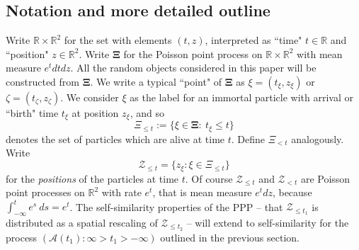 \documentclass[12pt]{article}
\renewcommand{\AA}{\mbox{${\mathcal A}$}}
\newcommand{\ZZ}{\mbox{${\mathcal Z}$}}
\newcommand{\Reals}{{\mathbb{R}}}
\begin{document}
\subsection{Notation and more detailed outline}
\label{sec:outline}
Write $\Reals \times \Reals^2$ for the set with elements $(t,z)$, 
interpreted as ``time" $t \in \Reals$ and ``position" $z \in \Reals^2$. 
Write $\bm{\Xi}$ for the Poisson point process on  $\Reals \times \Reals^2$ with mean measure 
$e^{t} dt dz$.
All the random objects considered in this paper will be constructed from $\bm{\Xi}$.
We write a typical ``point" of $\bm{\Xi}$ as $\xi = (t_\xi, z_\xi)$ or $\zeta = (t_\zeta, z_\zeta)$.
We consider $\xi$ as the label for an immortal particle with arrival or ``birth" time $t_\xi$ at position $z_\xi$, and so
\[ \Xi_{\le t} := \{\xi \in \bm{\Xi} : \ t_\xi \le t\} \]
denotes the set of particles which are alive at time $t$. 
Define $\Xi_{<t}$ analogously.
Write
\[ \ZZ_{\le t} = \{ z_\xi: \xi \in \Xi_{\le t} \} \]
for the {\em positions} of the particles at time $t$.
Of course  $\ZZ_{\le t}$ and $\ZZ_{<t}$ are Poisson point processes on $\Reals^2$ with rate $e^t$, that is mean measure $e^t dz$, 
because $\int_{-\infty}^t e^s \ ds = e^t$.  
The self-similarity properties of the PPP -- that $\ZZ_{\le t_1}$ is distributed as a spatial rescaling of $\ZZ_{\le t_2}$ -- will 
extend to self-similarity for  the process $(\AA(t_1) : \infty > t_1 > -\infty)$ 
outlined in the previous section.
\end{document}
